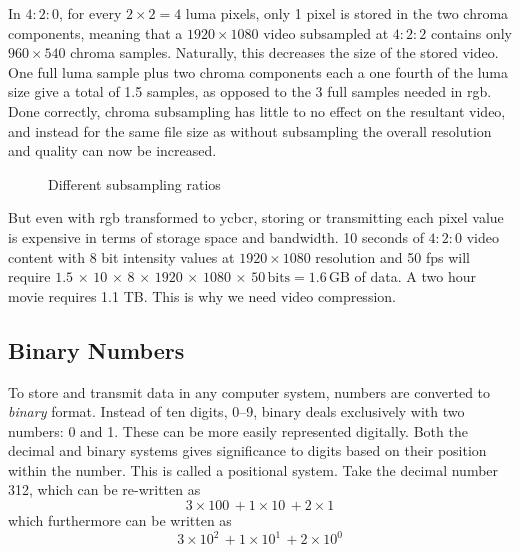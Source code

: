 In $4:2:0$, for every $2 \times 2 = 4$ luma pixels, only 1 pixel is stored in the two chroma components, meaning that a $1920 \times 1080$ video subsampled at $4:2:2$ contains only $960 \times 540$ chroma samples. Naturally, this decreases the size of the stored video. One full luma sample plus two chroma components each a one fourth of the luma size give a total of 1.5 samples, as opposed to the 3 full samples needed in \gls{rgb}. Done correctly, chroma subsampling has little to no effect on the resultant video, and instead for the same file size as without subsampling the overall resolution and quality can now be increased.

\begin{figure}
    \centering
        {}
    \caption{Different subsampling ratios}
    \label{fig:subsampling_ratios}
\end{figure}

But even with \gls{rgb} transformed to \gls{ycbcr}, storing or transmitting each pixel value is expensive in terms of storage space and bandwidth. 10 seconds of $4:2:0$ video content with 8 bit intensity values at $1920 \times 1080$ resolution and 50 \gls{fps} will require $1.5 \,\times\, 10 \,\times\, 8 \,\times\, 1920 \,\times\, 1080 \,\times\, 50 \, \text{bits}= 1.6 \, \text{GB}$ of data. A two hour movie requires 1.1 TB. This is why we need video compression.

\subsection{Binary Numbers}
\label{subsec:binary-numbers}
To store and transmit data in any computer system, numbers are converted to \textit{binary} format. Instead of ten digits, 0--9, binary deals exclusively with two numbers: 0 and 1. These can be more easily represented digitally. Both the decimal and binary systems gives significance to digits based on their position within the number. This is called a positional system. Take the decimal number 312, which can be re-written as $$3 \times 100\, + 1 \times 10\, + 2 \times 1$$ which furthermore can be written as $$3 \times 10^2\, + 1 \times 10^1\, + 2 \times 10^0$$

